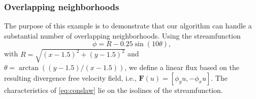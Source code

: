 {\large
\begin{table}
\centering
{}
\quad
{}

\caption{Errors for the linear convergence study. ADD METHOD DETAILS TO
DESCRIPTION - USED WHICH GRADIENT RECON. ADD 400 POINTS}
\end{table}
}

\subsubsection{Overlapping neighborhoods}
The purpose of this example is to demonstrate that our algorithm can handle a substantial number of overlapping neighborhoods.  
Using the streamfunction
$$
\phi = R - 0.25\sin(10\theta),
$$
with $R = \sqrt{(x-1.5)^2+(y-1.5)^2}$ and $\theta = \arctan((y-1.5)/(x-1.5))$, we define a linear flux based on the resulting divergence free velocity field, i.e.,  $\mathbf{F}(u) = [\phi_y u, -\phi_xu]$.  The characteristics of \eqref{eq:conslaw} lie on the isolines of the streamfunction.

